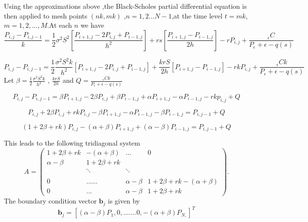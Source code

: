 \documentclass[12pt]{article}
\numberwithin{equation}{section} %
\begin{document}
 Using the approximations above ,the Black-Scholes partial differential
 equation is then applied to mesh points $(nk,mk)$ ,$n=1,2...N-1$,at
 the time level $t=mk$,$m=1,2,...,M$.At each $n$ we have
 \begin{equation*}
  \frac{P_{i,j}-P_{i,j-1}}{k}=\frac{1}{2}\sigma^2S^2\left[\frac{P_{i+1,j}-2P_{i,j}+P_{i-1,j}}{h^2}\right]+rs\left[\frac{P_{i+1,j}-P_{i-1,j}}{2h}\right]-rP_{i,j}+\frac{_{\epsilon}C}{P_{\epsilon}+\epsilon-q(s)}
 \end{equation*}

  \begin{equation*}
P_{i,j}-P_{i,j-1}=\frac{1}{2}\frac{\sigma^2S^2k}{h^2}\left[
P_{i+1,j}-2P_{i,j}+P_{i-1,j}\right]+\frac{krS}{2h}\left[
P_{i+1,j}-P_{i-1,j}\right]-rkP_{i,j}+\frac{_{\epsilon}Ck}{P_{\epsilon}+\epsilon-q(s)}
 \end{equation*}
 Let $\beta=\frac{1}{2}\frac{\sigma^2S^2k}{h^2}$ , $\frac{krS}{2h}$
 and $Q=\frac{_{\epsilon}Ck}{P_{\epsilon}+\epsilon-q(s)}$

 \begin{equation*}
P_{i,j}-P_{i,j-1}=\beta P_{i+1,j}-2\beta P_{i,j}+\beta
P_{i-1,j}+\alpha P_{i+1,j}-\alpha P_{i-1,j}-rkp_{i,j} +Q
 \end{equation*}

  \begin{equation*}
P_{i,j}+2\beta P_{i,j}+rkP_{i,j}-\beta P_{i+1,j}-\alpha
P_{i-1,j}-\beta P_{i-1,j}=P_{i,j-1}+Q
 \end{equation*}

 \begin{equation*}
(1+2\beta
+rk)P_{i,j}-(\alpha+\beta)P_{i+1,j}+(\alpha-\beta)P_{i-1,j}=P_{i,j-1}+Q
 \end{equation*}

This leads to the following tridiagonal system
\[A = \left( \begin{array}{cccc}
1+2\beta +rk& -(\alpha+\beta) & ...& 0\\
\alpha-\beta & 1+2\beta +rk &  & \\
& \ddots & \ddots &  \\
& & &  \\
 0&......& \alpha-\beta&1+2\beta+rk  -(\alpha+\beta) \\
 0 &...&\alpha-\beta & 1+2\beta
+rk \end{array} \right) .\] The boundary condition vector
$\textbf{b}_j$ is given by
\begin{equation*}
\textbf{b}_j=  \left[
(\alpha-\beta)P_{1},0,.......0,-(\alpha+\beta)P_{N,}\right]^{T}
 \end{equation*}
\end{document}

